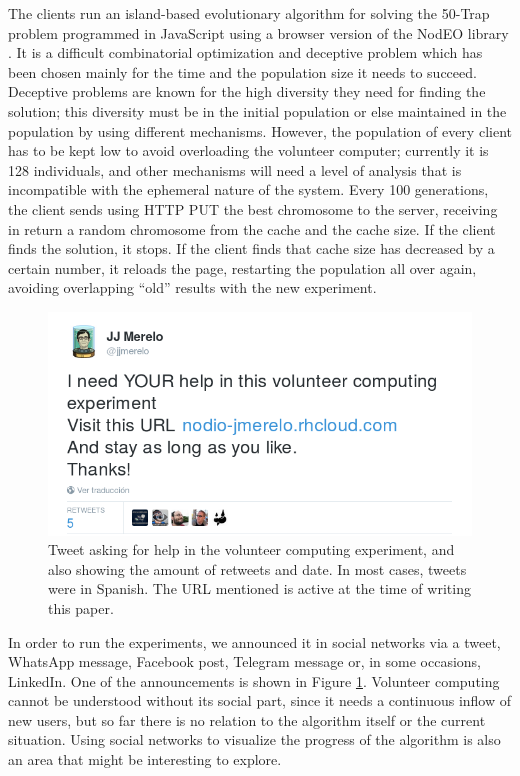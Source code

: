 \documentclass{sig-alternate}
\begin{document}
The clients run an island-based evolutionary algorithm for solving the
50-Trap problem programmed in JavaScript using a browser version of
the NodEO library \cite{DBLP:conf/gecco/GuervosVGES14,figshare:nodeo,nodeo2014}. It is a difficult combinatorial optimization and
deceptive problem which has been chosen mainly for the time and the
population size it needs to succeed. Deceptive problems are known for
the high diversity they need for finding the solution; this diversity
must be in the initial population or else maintained in the population
by using different mechanisms. However, the population of every client
has to be kept low to avoid overloading the volunteer computer;
currently it is 128 individuals, and other mechanisms will need a
level of analysis that is incompatible with the ephemeral nature of
the system. Every 100 generations, the client sends using HTTP PUT the
best chromosome to the server, receiving in return a random chromosome
from the cache and the cache size. If the client finds the solution,
it stops. If the client finds that cache size has decreased by a
certain number, it reloads the page, restarting the population all
over again, avoiding overlapping ``old'' results with the new
experiment.
 
\begin{figure}[!htb]
\centering
\includegraphics[width=0.99\linewidth]{tweet.png}
\caption{Tweet asking for help in the volunteer computing experiment,
  and also showing the amount of retweets and date. In most cases,
  tweets were in Spanish. The URL mentioned is active at the time of
  writing this paper. \label{fig:tweet}}
\end{figure}
%
In order to run the experiments, we announced it in social networks
via a tweet, WhatsApp message, Facebook post, Telegram message or, in
some occasions, LinkedIn. One of the announcements is shown in Figure
\ref{fig:tweet}. Volunteer computing cannot be understood without its
social part, since it needs a continuous inflow of new
users, but so far there is no relation to the algorithm itself or the
current situation. Using social networks to visualize the progress of
the algorithm is also an area that might be interesting to explore. 
\end{document}
